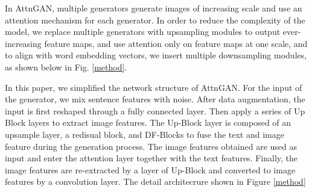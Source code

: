 \documentclass[runningheads, orivec]{llncs}
\begin{document}
In AttnGAN, multiple generators generate images of increasing scale and use an attention mechanism for each generator. In order to reduce the complexity of the model, we replace multiple generators with upsampling modules to output ever-increasing feature maps, and use attention only on feature maps at one scale, and to align with word embedding vectors, we insert multiple downsampling modules, as shown below in Fig. \ref{method}.


In this paper, we simplified the network structure of AttnGAN. For the input of the generator, we mix sentence features with noise. After data augmentation, the input is first reshaped through a fully connected layer. Then apply a series of Up Block layers to extract image features. The Up-Block layer is composed of an upsample layer, a redisual block, and DF-Blocks to fuse the text and image feature during the generation process. The image features obtained are used as  input and enter the attention layer together with the text features. Finally, the image features are re-extracted by a layer of Up-Block and converted to image features by a convolution layer. The detail architecrure shown in Figure \ref{method}
\end{document}
